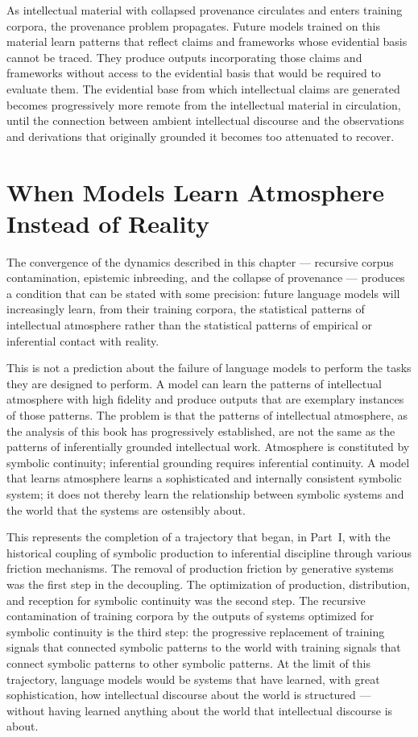 \documentclass[12pt, openright, twoside]{book}
\begin{document}
As intellectual material with collapsed provenance
circulates and enters training corpora, the
provenance problem propagates. Future models
trained on this material learn patterns that
reflect claims and frameworks whose evidential
basis cannot be traced. They produce outputs
incorporating those claims and frameworks
without access to the evidential basis that
would be required to evaluate them. The
evidential base from which intellectual claims
are generated becomes progressively more remote
from the intellectual material in circulation,
until the connection between ambient intellectual
discourse and the observations and derivations
that originally grounded it becomes too attenuated
to recover.

\section{When Models Learn Atmosphere Instead of Reality}

The convergence of the dynamics described in this
chapter --- recursive corpus contamination, epistemic
inbreeding, and the collapse of provenance --- produces
a condition that can be stated with some precision:
future language models will increasingly learn,
from their training corpora, the statistical patterns
of intellectual atmosphere rather than the statistical
patterns of empirical or inferential contact with reality.

This is not a prediction about the failure of language
models to perform the tasks they are designed to perform.
A model can learn the patterns of intellectual atmosphere
with high fidelity and produce outputs that are
exemplary instances of those patterns. The problem is
that the patterns of intellectual atmosphere, as
the analysis of this book has progressively established,
are not the same as the patterns of inferentially
grounded intellectual work. Atmosphere is constituted
by symbolic continuity; inferential grounding requires
inferential continuity. A model that learns atmosphere
learns a sophisticated and internally consistent
symbolic system; it does not thereby learn the
relationship between symbolic systems and the world
that the systems are ostensibly about.

This represents the completion of a trajectory that
began, in Part~I, with the historical coupling of
symbolic production to inferential discipline through
various friction mechanisms. The removal of production
friction by generative systems was the first step in
the decoupling. The optimization of production, distribution,
and reception for symbolic continuity was the second
step. The recursive contamination of training corpora
by the outputs of systems optimized for symbolic
continuity is the third step: the progressive replacement
of training signals that connected symbolic patterns
to the world with training signals that connect symbolic
patterns to other symbolic patterns. At the limit of
this trajectory, language models would be systems that
have learned, with great sophistication, how intellectual
discourse about the world is structured --- without
having learned anything about the world that intellectual
discourse is about.
\end{document}

